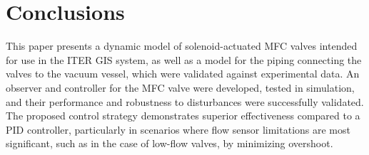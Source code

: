 \documentclass[letterpaper, 10pt, conference]{ieeeconf}
\begin{document}
\section{Conclusions}\label{sec:conclusion}
This paper presents a dynamic model of solenoid-actuated MFC valves intended for use in the ITER GIS system, as well as a model for the piping connecting the valves to the vacuum vessel, which were validated against experimental data. An observer and controller for the MFC valve were developed, tested in simulation, and their performance and robustness to disturbances were successfully validated. The proposed control strategy demonstrates superior effectiveness compared to a PID controller, particularly in scenarios where flow sensor limitations are most significant, such as in the case of low-flow valves, by minimizing overshoot.

 
\end{document}
